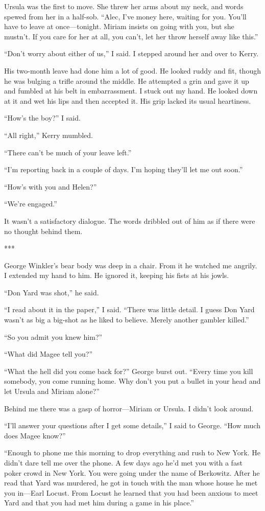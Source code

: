 \documentclass{novel}
\begin{document}
Ursula was the first to move. She threw her arms about my neck, and words spewed from her in a half-sob. “Alec, I’ve money here, waiting for you. You’ll have to leave at once—tonight. Miriam insists on going with you, but she mustn’t. If you care for her at all, you can’t, let her throw herself away like this.”

“Don’t worry about either of us,” I said. I stepped around her and over to Kerry.

His two-month leave had done him a lot of good. He looked ruddy and fit, though he was bulging a trifle around the middle. He attempted a grin and gave it up and fumbled at his belt in embarrassment. I stuck out my hand. He looked down at it and wet his lips and then accepted it. His grip lacked its usual heartiness.

“How’s the boy?” I said.

“All right,” Kerry mumbled.

“There can’t be much of your leave left.”

“I’m reporting back in a couple of days. I’m hoping they’ll let me out soon.”

“How’s with you and Helen?”

“We’re engaged.”

It wasn’t a satisfactory dialogue. The words dribbled out of him as if there were no thought behind them.

***

George Winkler’s bear body was deep in a chair. From it he watched me angrily. I extended my hand to him. He ignored it, keeping his fists at his jowls.

“Don Yard was shot,” he said.

“I read about it in the paper,” I said. “There was little detail. I guess Don Yard wasn’t as big a big-shot as he liked to believe. Merely another gambler killed.”

“So you admit you knew him?”

“What did Magee tell you?”

“What the hell did you come back for?” George burst out. “Every time you kill somebody, you come running home. Why don’t you put a bullet in your head and let Ursula and Miriam alone?”

Behind me there was a gasp of horror—Miriam or Ursula. I didn’t look around.

“I’ll answer your questions after I get some details,” I said to George. “How much does Magee know?”

“Enough to phone me this morning to drop everything and rush to New York. He didn’t dare tell me over the phone. A few days ago he’d met you with a fast poker crowd in New York. You were going under the name of Berkowitz. After he read that Yard was murdered, he got in touch with the man whose house he met you in—Earl Locust. From Locust he learned that you had been anxious to meet Yard and that you had met him during a game in his place.”
\end{document}
